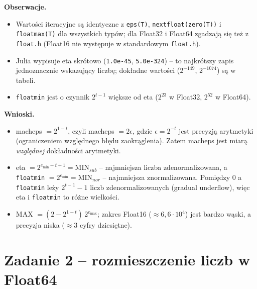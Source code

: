 \documentclass[11pt,a4paper]{article}
\begin{document}
\textbf{Obserwacje.}
\begin{itemize}
\item Wartości iteracyjne są identyczne z \texttt{eps(T)}, \texttt{nextfloat(zero(T))} i \texttt{floatmax(T)} dla wszystkich typów; dla Float32 i Float64 zgadzają się też z \texttt{float.h} (Float16 nie występuje w standardowym \texttt{float.h}).
\item Julia wypisuje eta skrótowo (\texttt{1.0e-45}, \texttt{5.0e-324}) -- to najkrótszy zapis jednoznacznie wskazujący liczbę; dokładne wartości ($2^{-149}$, $2^{-1074}$) są w tabeli.
\item \texttt{floatmin} jest o czynnik $2^{t-1}$ większe od eta ($2^{23}$ w Float32, $2^{52}$ w Float64).
\end{itemize}

\textbf{Wnioski.}
\begin{itemize}
\item macheps $=2^{1-t}$, czyli macheps $=2\epsilon$, gdzie $\epsilon=2^{-t}$ jest precyzją arytmetyki (ograniczeniem względnego błędu zaokrąglenia). Zatem macheps jest miarą \emph{względnej} dokładności arytmetyki.
\item eta $=2^{e_{\min}-t+1}=\mathrm{MIN}_{sub}$ -- najmniejsza liczba zdenormalizowana, a \texttt{floatmin} $=2^{e_{\min}}=\mathrm{MIN}_{nor}$ -- najmniejsza znormalizowana. Pomiędzy 0 a \texttt{floatmin} leży $2^{t-1}-1$ liczb zdenormalizowanych (gradual underflow), więc eta i \texttt{floatmin} to różne wielkości.
\item MAX $=(2-2^{1-t})\,2^{e_{\max}}$; zakres Float16 ($\approx6{,}6\cdot10^4$) jest bardzo wąski, a precyzja niska ($\approx3$ cyfry dziesiętne).
\end{itemize}

\section{Zadanie 2 -- rozmieszczenie liczb w Float64}
\end{document}

